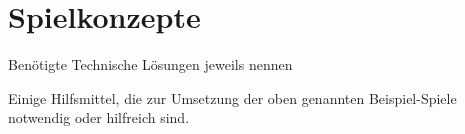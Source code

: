 \chapter{Spielkonzepte}

{\color{red}Benötigte Technische Lösungen jeweils nennen}

Einige Hilfsmittel, die zur Umsetzung der oben genannten Beispiel-Spiele notwendig oder
hilfreich sind.




















\newpage